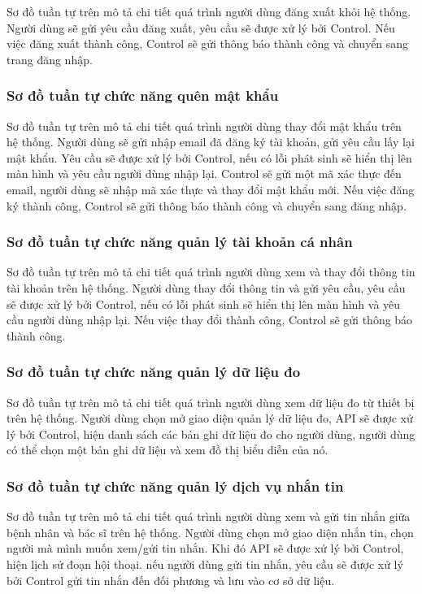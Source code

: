 Sơ đồ tuần tự trên mô tả chi tiết quá trình người dùng đăng xuất khỏi hệ thống. Người dùng sẽ gửi yêu cầu đăng xuất, yêu cầu sẽ được xử lý
bởi Control. Nếu việc đăng xuất thành công, Control sẽ gửi thông báo 
thành công và chuyển sang trang đăng nhập. 

\subsubsection{Sơ đồ tuần tự chức năng quên mật khẩu}

Sơ đồ tuần tự trên mô tả chi tiết quá trình người dùng thay đổi mật khẩu trên hệ thống. Người dùng sẽ gửi nhập email đã đăng ký tài khoản, gửi yêu cầu
lấy lại mật khẩu. Yêu cầu sẽ được xử lý bởi Control, nếu có lỗi phát sinh sẽ hiển thị lên màn hình và yêu cầu người dùng nhập lại. Control sẽ gửi một mã xác thực
đến email, người dùng sẽ nhập mã xác thực và thay đổi mật khẩu mới. Nếu việc đăng ký thành công,
Control sẽ gửi thông báo thành công và chuyển sang đăng nhập.

\subsubsection{Sơ đồ tuần tự chức năng quản lý tài khoản cá nhân}

Sơ đồ tuần tự trên mô tả chi tiết quá trình người dùng xem và thay đổi thông tin tài khoản trên hệ thống. Người dùng thay đổi thông tin và gửi yêu cầu, 
yêu cầu sẽ được xử lý bởi Control, nếu có lỗi phát sinh sẽ hiển thị lên màn hình và yêu cầu người dùng nhập lại. Nếu việc thay đổi thành công, Control sẽ gửi thông báo 
thành công.  

\subsubsection{Sơ đồ tuần tự chức năng quản lý dữ liệu đo}

Sơ đồ tuần tự trên mô tả chi tiết quá trình người dùng xem dữ liệu đo từ thiết bị trên hệ thống. Người dùng chọn mở giao diện quản lý dữ liệu đo, 
API sẽ được xử lý bởi Control, hiện danh sách các bản ghi dữ liệu đo cho người dùng, người dùng có thể chọn một bản ghi dữ liệu và xem đồ thị biểu diễn
của nó. 

\subsubsection{Sơ đồ tuần tự chức năng quản lý dịch vụ nhắn tin}

Sơ đồ tuần tự trên mô tả chi tiết quá trình người dùng xem và gửi tin nhắn giữa bệnh nhân và bác sĩ trên hệ thống. Người dùng chọn mở giao diện nhắn tin, 
chọn người mà mình muốn xem/gửi tin nhắn. Khi đó API sẽ được xử lý bởi Control, hiện lịch sử đoạn hội thoại. nếu người dùng gửi tin nhắn, yêu cầu sẽ được 
xử lý bởi Control gửi tin nhắn đến đối phương và lưu vào cơ sở dữ liệu.

